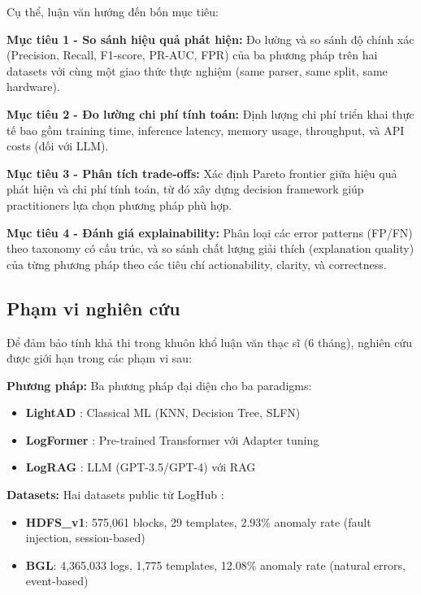 Cụ thể, luận văn hướng đến bốn mục tiêu:

\textbf{Mục tiêu 1 - So sánh hiệu quả phát hiện:} Đo lường và so sánh độ chính xác (Precision, Recall, F1-score, PR-AUC, FPR) của ba phương pháp trên hai datasets với cùng một giao thức thực nghiệm (same parser, same split, same hardware).

\textbf{Mục tiêu 2 - Đo lường chi phí tính toán:} Định lượng chi phí triển khai thực tế bao gồm training time, inference latency, memory usage, throughput, và API costs (đối với LLM).

\textbf{Mục tiêu 3 - Phân tích trade-offs:} Xác định Pareto frontier giữa hiệu quả phát hiện và chi phí tính toán, từ đó xây dựng decision framework giúp practitioners lựa chọn phương pháp phù hợp.

\textbf{Mục tiêu 4 - Đánh giá explainability:} Phân loại các error patterns (FP/FN) theo taxonomy có cấu trúc, và so sánh chất lượng giải thích (explanation quality) của từng phương pháp theo các tiêu chí actionability, clarity, và correctness.

\subsection{Phạm vi nghiên cứu}

Để đảm bảo tính khả thi trong khuôn khổ luận văn thạc sĩ (6 tháng), nghiên cứu được giới hạn trong các phạm vi sau:

\textbf{Phương pháp:} Ba phương pháp đại diện cho ba paradigms:
\begin{itemize}
    \item \textbf{LightAD} \cite{yu2024lightad}: Classical ML (KNN, Decision Tree, SLFN)
    \item \textbf{LogFormer} \cite{guo2024logformer}: Pre-trained Transformer với Adapter tuning
    \item \textbf{LogRAG} \cite{jiang2024lograg}: LLM (GPT-3.5/GPT-4) với RAG
\end{itemize}

\textbf{Datasets:} Hai datasets public từ LogHub \cite{zhu2023loghub}:
\begin{itemize}
    \item \textbf{HDFS\_v1}: 575,061 blocks, 29 templates, 2.93\% anomaly rate (fault injection, session-based)
    \item \textbf{BGL}: 4,365,033 logs, 1,775 templates, 12.08\% anomaly rate (natural errors, event-based)
\end{itemize}

